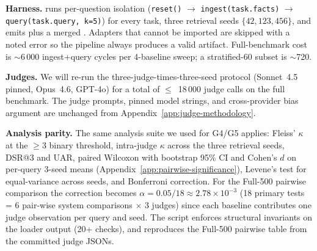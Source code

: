 \documentclass{article}
\begin{document}
\textbf{Harness.} 
runs per-question isolation (\texttt{reset()} $\to$
\texttt{ingest(task.facts)} $\to$ \texttt{query(task.query, k=5)})
for every task, three retrieval seeds $\{42, 123, 456\}$, and emits
 plus a
merged . Adapters that cannot be
imported are skipped with a noted error so the pipeline always produces
a valid artifact. Full-benchmark cost is $\sim$6\,000 ingest+query
cycles per 4-baseline sweep; a stratified-60 subset is $\sim$720.

\textbf{Judges.} We will re-run the three-judge-times-three-seed
protocol (Sonnet~4.5 pinned, Opus~4.6, GPT-4o) for a total of
$\leq$~18\,000 judge calls on the full benchmark. The judge prompts,
pinned model strings, and cross-provider bias argument are unchanged
from Appendix~\ref{app:judge-methodology}.

\textbf{Analysis parity.} The same analysis suite we used for G4/G5
applies: Fleiss' $\kappa$ at the $\geq 3$ binary threshold, intra-judge
$\kappa$ across the three retrieval seeds, DSR@3 and UAR, paired
Wilcoxon with bootstrap 95\% CI and Cohen's $d$ on per-query 3-seed
means (Appendix~\ref{app:pairwise-significance}), Levene's test for
equal-variance across seeds, and Bonferroni correction. For the
Full-500 pairwise comparison the correction becomes
$\alpha = 0.05 / 18 \approx 2.78 \times 10^{-3}$ (18 primary tests =
6 pair-wise system comparisons $\times$ 3 judges) since each baseline
contributes one judge observation per query and seed. The
 script enforces
structural invariants on the loader output (20+ checks), and
 reproduces
the Full-500 pairwise table from the committed judge JSONs.
\end{document}
